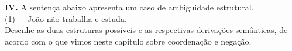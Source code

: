 \begin{tcolorbox}[parbox=false,boxrule=0pt,sharp corners,breakable]
\n\textbf{IV.} A sentença abaixo apresenta um caso de ambiguidade estrutural.\\

\n (1)\ \ \ João não trabalha e estuda.\\


\n Desenhe as duas estruturas possíveis e as respectivas derivações semânticas, de acordo com o que vimos neste capítulo sobre coordenação e negação.

\end{tcolorbox}
